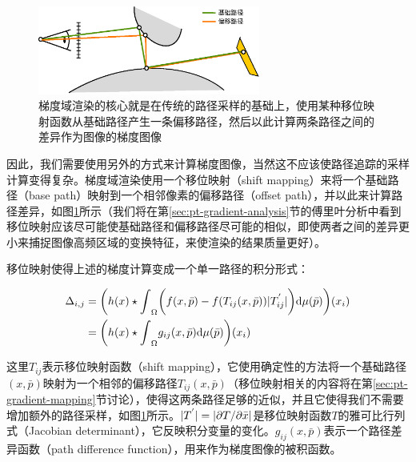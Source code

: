\begin{figure}
	\sidecaption
	\includegraphics[width=0.65\textwidth]{figures/pt/shift-mapping.eps}
	\caption{梯度域渲染的核心就是在传统的路径采样的基础上，使用某种移位映射函数从基础路径产生一条偏移路径，然后以此计算两条路径之间的差异作为图像的梯度图像}
	\label{f:pt-shift-mapping}
\end{figure}

因此，我们需要使用另外的方式来计算梯度图像，当然这不应该使路径追踪的采样计算变得复杂。梯度域渲染使用一个移位映射（shift mapping）来将一个基础路径（base path）映射到一个相邻像素的偏移路径（offset path），并以此来计算路径差异，如图\ref{f:pt-shift-mapping}所示（我们将在第\ref{sec:pt-gradient-analysis}节的傅里叶分析中看到移位映射应该尽可能使基础路径和偏移路径尽可能的相似，即使两者之间的差异更小来捕捉图像高频区域的变换特征，来使渲染的结果质量更好）。

移位映射使得上述的梯度计算变成一个单一路径的积分形式：

\begin{equation}\label{e:pt-gradient-equation}
\begin{aligned}
	\Delta_{i,j}&=\bigg( h(x)\star{\rm \int}_\Omega \bigg( f(x,\bar{p})-f(T_{ij}(x,\bar{p}))|T^{'}_{ij}| \bigg) {\rm d}\mu(\bar{p}) \bigg)(x_i)\\
	&=\bigg(h(x)\star{\rm \int}_\Omega g_{ij}(x, \bar{p}){\rm d}\mu(\bar{p}) \bigg)(x_i)
\end{aligned}
\end{equation}

\noindent 这里$T_{ij}$表示移位映射函数（shift mapping），它使用确定性的方法将一个基础路径$(x,\bar{p})$映射为一个相邻的偏移路径$T_{ij}(x,\bar{p})$（移位映射相关的内容将在第\ref{sec:pt-gradient-mapping}节讨论），使得这两条路径足够的近似，并且它使得我们不需要增加额外的路径采样，如图\ref{f:pt-shift-mapping}所示。$|T^{'}|=|{\rm \partial} T/{\rm \partial} \bar{x}|$是移位映射函数$T$的雅可比行列式（Jacobian determinant），它反映积分变量的变化。$g_{ij}(x,\bar{p})$表示一个路径差异函数（path difference function），用来作为梯度图像的被积函数。





